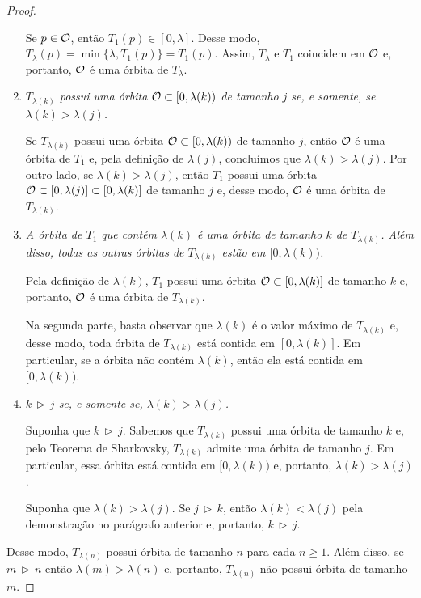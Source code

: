 \begin{proof}
\begin{enumerate}[label=\alph*)]
Se $p \in \mathcal{O}$, então $T_1(p) \in [0, \lambda]$. Desse modo, $T_\lambda(p) = \min \lbrace \lambda, T_1(p) \rbrace = T_1(p)$.
Assim, $T_\lambda$ e $T_1$ coincidem em $\mathcal{O}$ e, portanto, $\mathcal{O}$ é uma órbita de $T_\lambda$.

\item \textit{$T_{\lambda(k)}$ possui uma órbita $\mathcal{O} \subset [0, \lambda(k))$ de tamanho $j$ se, e somente, se $\lambda(k) > \lambda(j)$.}

Se $T_{\lambda(k)}$ possui uma órbita $\mathcal{O} \subset [0, \lambda(k))$ de tamanho $j$, então $\mathcal{O}$ é uma órbita de $T_1$ e, pela definição de $\lambda(j)$, concluímos que $\lambda(k) > \lambda(j)$.
Por outro lado, se $\lambda(k) > \lambda(j)$, então $T_1$ possui uma órbita $\mathcal{O} \subset [0, \lambda(j)] \subset [0, \lambda(k)]$ de tamanho $j$ e, desse modo, $\mathcal{O}$ é uma órbita de $T_{\lambda(k)}$.

\item \textit{A órbita de $T_1$ que contém $\lambda(k)$ é uma órbita de tamanho $k$ de $T_{\lambda(k)}$.
Além disso, todas as outras órbitas de $T_{\lambda(k)}$ estão em $[0, \lambda(k))$.} 

Pela definição de $\lambda(k)$, $T_1$ possui uma órbita $\mathcal{O} \subset [0, \lambda(k)]$ de tamanho $k$ e, portanto, $\mathcal{O}$ é uma órbita de $T_{\lambda(k)}$.

Na segunda parte, basta observar que $\lambda(k)$ é o valor máximo de $T_{\lambda(k)}$ e, desse modo, toda órbita de $T_{\lambda(k)}$ está contida em $[0, \lambda(k)]$.
Em particular, se a órbita não contém $\lambda(k)$, então ela está contida em $[0, \lambda(k))$.

\item \textit{$k \, \triangleright \, j$ se, e somente se, $\lambda(k) > \lambda(j)$.}

Suponha que $k \, \triangleright \, j$. Sabemos que $T_{\lambda(k)}$ possui uma órbita de tamanho $k$ e, pelo Teorema de Sharkovsky, $T_{\lambda(k)}$ admite uma órbita de tamanho $j$. Em particular, essa órbita está contida em $[0, \lambda(k))$ e, portanto, $\lambda(k) > \lambda(j)$.

Suponha que $\lambda(k) > \lambda(j)$. Se $j \, \triangleright \, k$, então $\lambda(k) < \lambda(j)$ pela demonstração no parágrafo anterior e, portanto, $k \, \triangleright \, j$.
\end{enumerate}

Desse modo, $T_{\lambda(n)}$ possui órbita de tamanho $n$ para cada $n \geq 1$. Além disso, se $m \, \triangleright \, n$ então $\lambda(m) > \lambda(n)$ e, portanto, $T_{\lambda(n)}$ não possui órbita de tamanho $m$.
\end{proof}
